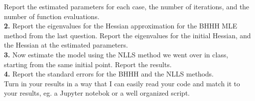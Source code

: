 \documentclass[10pt]{article}
\begin{document}
Report the estimated parameters for each case, the number of iterations, and the number of function evaluations.\\

\noindent \textbf{2.} Report the eigenvalues for the Hessian approximation for the BHHH MLE method from the last question. Report the eigenvalues for the initial Hessian, and the Hessian at the estimated parameters.  \\

\noindent \textbf{3.} Now estimate the model using the NLLS method we went over in class, starting from the same initial point. Report the results. \\

\noindent \textbf{4.} Report the standard errors for the BHHH and the NLLS methods. \\


\noindent
Turn in your results in a way that I can easily read your code and match it to your results, eg. a Jupyter notebok or a well organized script.
\end{document}

